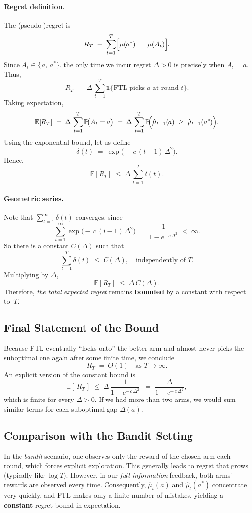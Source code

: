 \paragraph{Regret definition.}
The (pseudo-)regret is
\[
  R_T
  \;=\;
  \sum_{t=1}^T
  \Bigl[\mu(a^*) \;-\;\mu(A_t)\Bigr].
\]
Since $A_t \in \{\,a,\,a^*\!\}$, the only time we incur regret $\Delta>0$ is precisely when $A_t=a$.  Thus,
\[
  R_T
  \;=\;
  \Delta \,\sum_{t=1}^T \mathbf{1}\{\text{FTL picks $a$ at round $t$}\}.
\]
Taking expectation,
\[
  \mathbb{E}[R_T]
  \;=\;
  \Delta \,\sum_{t=1}^T
  \mathbb{P}\!\bigl(A_t = a\bigr)
  \;=\;
  \Delta \,\sum_{t=1}^T
  \mathbb{P}\!\Bigl(\hat{\mu}_{t-1}(a)\;\ge\;\hat{\mu}_{t-1}(a^*)\Bigr).
\]
Using the exponential bound, let us define
\[
  \delta(t)
  \;=\;
  \exp\bigl(-\,c\,(t-1)\,\Delta^2\bigr).
\]
Hence,
\[
  \mathbb{E}[R_T]
  \;\le\;
  \Delta \,\sum_{t=1}^T \delta(t).
\]

\paragraph{Geometric series.}
Note that $\sum_{t=1}^\infty \delta(t)$ converges, since
\[
  \sum_{t=1}^\infty
  \exp\bigl(-\,c\,(t-1)\,\Delta^2\bigr)
  \;=\;
  \frac{1}{1 - e^{-\,c\,\Delta^2}}
  \;<\;\infty.
\]
So there is a constant $C(\Delta)$ such that
\[
  \sum_{t=1}^T
  \delta(t)
  \;\le\;
  C(\Delta),
  \quad
  \text{independently of $T$.}
\]
Multiplying by $\Delta$,
\[
  \mathbb{E}[R_T]
  \;\le\;
  \Delta \,C(\Delta).
\]
Therefore, \emph{the total expected regret} remains \textbf{bounded} by a constant with respect to~$T$.

\subsection*{Final Statement of the Bound}

Because FTL eventually ``locks onto'' the better arm and almost never picks the suboptimal one again after some finite time, we conclude
\[
  R_T
  \;=\;
  O(1)
  \quad\text{as }T\to\infty.
\]
An explicit version of the constant bound is
\[
  \mathbb{E}[\,R_T\,]
  \;\le\;
  \Delta
  \,\frac{1}{1 - e^{-\,c\,\Delta^2}}
  \;\;=\;
  \frac{\Delta}{1 - e^{-\,c\,\Delta^2}},
\]
which is finite for every $\Delta>0$.  If we had more than two arms, we would sum similar terms for each suboptimal gap $\Delta(a)$.

\subsection*{Comparison with the Bandit Setting}

In the \emph{bandit} scenario, one observes only the reward of the chosen arm each round, which forces explicit exploration.  This generally leads to regret that grows (typically like $\log T$).  However, in our \emph{full-information} feedback, both arms' rewards are observed every time.  Consequently, $\hat{\mu}_{t}(a)$ and $\hat{\mu}_{t}(a^*)$ concentrate very quickly, and FTL makes only a finite number of mistakes, yielding a \textbf{constant} regret bound in expectation.